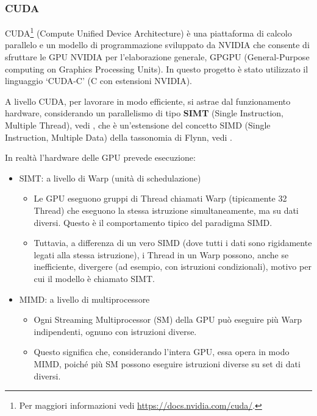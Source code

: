 \documentclass[12pt,a4paper]{report}
\begin{document}
\subsubsection{CUDA}

CUDA\footnote{Per maggiori informazioni vedi \url{https://docs.nvidia.com/cuda/}.} (Compute Unified Device Architecture) è una
piattaforma di calcolo parallelo e un modello di programmazione sviluppato da NVIDIA che consente di sfruttare le GPU NVIDIA per
l'elaborazione generale, GPGPU (General-Purpose computing on Graphics Processing Units).
In questo progetto è stato utilizzato il linguaggio `CUDA-C' (C con estensioni NVIDIA).

A livello CUDA, per lavorare in modo efficiente, si astrae dal funzionamento hardware, considerando un parallelismo di tipo
\textbf{SIMT} (Single Instruction, Multiple Thread), vedi \cite{NVIDIA2008}, che è un'estensione del concetto SIMD (Single
Instruction, Multiple Data) della tassonomia di Flynn, vedi \cite{Flynn1966}.

In realtà l'hardware delle GPU prevede esecuzione:
\begin{itemize}
  \item SIMT: a livello di Warp (unità di schedulazione)
        \begin{itemize}
          \item Le GPU eseguono gruppi di Thread chiamati Warp (tipicamente 32 Thread) che eseguono la stessa istruzione
                simultaneamente, ma su dati diversi. Questo è il comportamento tipico del paradigma SIMD.
          \item Tuttavia, a differenza di un vero SIMD (dove tutti i dati sono rigidamente legati alla stessa istruzione), i
                Thread in un Warp possono, anche se inefficiente, divergere (ad esempio, con istruzioni condizionali), motivo per
                cui il modello è chiamato SIMT.
        \end{itemize}
  \item MIMD: a livello di multiprocessore
        \begin{itemize}
          \item Ogni Streaming Multiprocessor (SM) della GPU può eseguire più Warp indipendenti, ognuno con istruzioni diverse.
          \item Questo significa che, considerando l'intera GPU, essa opera in modo MIMD, poiché più SM possono eseguire
                istruzioni diverse su set di dati diversi.
        \end{itemize}
\end{itemize}
\end{document}
